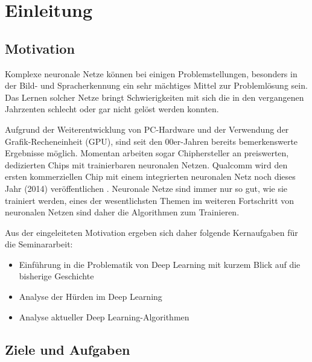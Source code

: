 \chapter{Einleitung}
\label{cha:einleitung}

\section{Motivation}

Komplexe neuronale Netze können bei einigen Problemstellungen, besonders in der Bild- und Spracherkennung ein sehr mächtiges Mittel zur Problemlösung sein. Das Lernen solcher Netze bringt Schwierigkeiten mit sich die in den vergangenen Jahrzenten schlecht oder gar nicht gelöst werden konnten.

Aufgrund der Weiterentwicklung von PC-Hardware und der Verwendung der Grafik-Recheneinheit (GPU), sind seit den 00er-Jahren bereits bemerkenswerte Ergebnisse möglich. Momentan arbeiten sogar Chiphersteller an preiswerten, dedizierten Chips mit trainierbaren neuronalen Netzen. Qualcomm wird den ersten kommerziellen Chip mit einem integrierten neuronalen Netz noch dieses Jahr (2014) veröffentlichen \cite{Qualcomm}. Neuronale Netze sind immer nur so gut, wie sie trainiert werden, eines der wesentlichsten Themen im weiteren Fortschritt von neuronalen Netzen sind daher die Algorithmen zum Trainieren.

Aus der eingeleiteten Motivation ergeben sich daher folgende Kernaufgaben für die Seminararbeit:


\begin{itemize}
\item Einführung in die Problematik von Deep Learning mit kurzem Blick auf die bisherige Geschichte
\item Analyse der Hürden im Deep Learning
\item Analyse aktueller Deep Learning-Algorithmen
\end{itemize}

\section{Ziele und Aufgaben}
 
